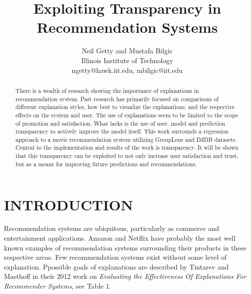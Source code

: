 \documentclass[letterpaper, 10 pt, conference]{ieeeconf}  %
\title{\LARGE \bf
Exploiting Transparency in Recommendation Systems%
}
\author{Neil Getty and Mustafa Bilgic\\Illinois Institute of Technology\\ngetty@hawk.iit.edu, mbilgic@iit.edu}
\begin{document}
\maketitle
\thispagestyle{empty}
\pagestyle{empty}


\begin{abstract}

There is a wealth of research showing the importance of explanations in recommendation system. Past research has primarily focused on comparisons of different explanation styles, how best to visualize the explanations, and the respective effects on the system and user. The use of explanations seem to be limited to the scope of promotion and satisfaction.  What lacks is the use of user, model and prediction transparency to actively improve the model itself. This work surrounds a regression approach to a movie recommendation system utilizing GroupLens and IMDB datasets. Central to the implementation and results of the work is transparency. It will be shown that this transparency can be exploited to not only increase user satisfaction and trust, but as a means for improving future predictions and recommendations.

\end{abstract}


\section{INTRODUCTION}
Recommendation systems are ubiquitous, particularly as commerce and entertainment applications. Amazon and Netflix have probably the most well known examples of recommendation systems surrounding their products in these respective areas. Few recommendation systems exist without some level of explanation. Ppossible goals of explanations are described by Tintarev and Masthoff in their 2012 work on \textit{Evaluating the Effectiveness Of Explanations For Recommender Systems}, see Table 1.
\end{document}
